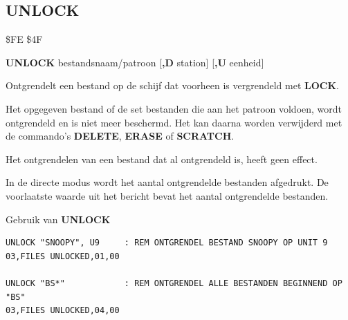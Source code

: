 
\newpage
\subsection{UNLOCK}
\begin{description}[leftmargin=2cm,style=nextline]
\item [Token:]    \$FE \$4F

\item [Formaat:]   {\bf UNLOCK} bestandsnaam/patroon [{\bf,D} station] [{\bf,U} eenheid]

\item [Gebruik:]    Ontgrendelt een bestand op de schijf dat voorheen is vergrendeld met {\bf LOCK}.

                  Het opgegeven bestand of de set bestanden die aan het patroon voldoen, wordt ontgrendeld en is niet meer beschermd. Het kan daarna worden verwijderd met de commando's {\bf DELETE}, {\bf ERASE} of {\bf SCRATCH}.

                  \filenamedefinition

                  \drivedefinition

                  \unitdefinition

\item [Opmerkingen:]  Het ontgrendelen van een bestand dat al ontgrendeld is, heeft geen effect.

                  In de directe modus wordt het aantal ontgrendelde bestanden afgedrukt. De voorlaatste waarde uit het bericht bevat het aantal ontgrendelde bestanden.

\item [Voorbeelden:] Gebruik van {\bf UNLOCK}

\begin{tcolorbox}[colback=black,coltext=white]
\verbatimfont{\codefont}
\begin{verbatim}
UNLOCK "SNOOPY", U9     : REM ONTGRENDEL BESTAND SNOOPY OP UNIT 9
03,FILES UNLOCKED,01,00

UNLOCK "BS*"            : REM ONTGRENDEL ALLE BESTANDEN BEGINNEND OP "BS"
03,FILES UNLOCKED,04,00
\end{verbatim}
\end{tcolorbox}
\end{description}


\newpage
